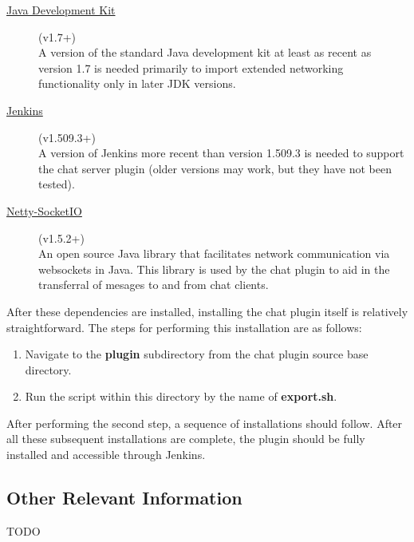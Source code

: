 \documentclass{article}
\begin{document}
		\begin{description}
			\item[\href{http://www.oracle.com/technetwork/java/javase/downloads/jdk7-downloads-1880260.html}{Java Development Kit}] (v1.7+) \hfill \\
			A version of the standard Java development kit at least as recent 
			as version 1.7 is needed primarily to import extended networking 
			functionality only in later JDK versions.

			\item[\href{http://jenkins-ci.org/}{Jenkins}] (v1.509.3+) \hfill \\
			A version of Jenkins more recent than version 1.509.3 is needed
			to support the chat server plugin (older versions may work, but they
			have not been tested).

			\item[\href{https://github.com/mrniko/netty-socketio/releases}{Netty-SocketIO}] (v1.5.2+) \hfill \\ 
			An open source Java library that facilitates network communication 
			via websockets in Java.  This library is used by the chat plugin
			to aid in the transferral of mesages to and from chat clients.
		\end{description}

		After these dependencies are installed, installing the chat plugin itself
		is relatively straightforward.  The steps for performing this installation
		are as follows:

		\begin{enumerate}
			\item Navigate to the \textbf{plugin} subdirectory from the chat
			plugin source base directory.

			\item Run the script within this directory by the name of 
			\textbf{export.sh}.
		\end{enumerate}

		After performing the second step, a sequence of installations should
		follow.  After all these subsequent installations are complete, the
		plugin should be fully installed and accessible through Jenkins.

		\subsection[Other Information]{Other Relevant Information}
		TODO
\end{document}
